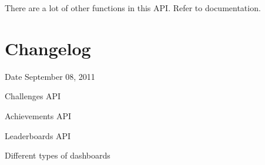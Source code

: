 There are a lot of other functions in this API. Refer to documentation.\hypertarget{main_sec_5}{}\section{Changelog}\label{main_sec_5}
Date September 08, 2011
\begin{DoxyItemize}
\item Challenges API
\item Achievements API
\item Leaderboards API
\item Different types of dashboards 
\end{DoxyItemize}
